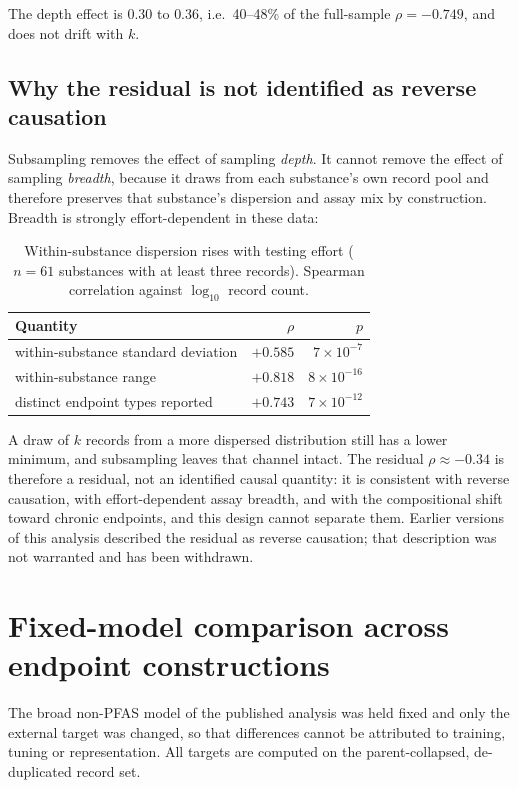 \documentclass[11pt]{article}
\begin{document}
The depth effect is $0.30$ to $0.36$, i.e.\ 40--48\% of the full-sample
$\rho=-0.749$, and does not drift with $k$.

\subsection*{Why the residual is not identified as reverse causation}

Subsampling removes the effect of sampling \emph{depth}. It cannot remove the
effect of sampling \emph{breadth}, because it draws from each substance's own
record pool and therefore preserves that substance's dispersion and assay mix
by construction. Breadth is strongly effort-dependent in these data:

\begin{table}[h]
\centering
\caption{Within-substance dispersion rises with testing effort ($n=61$
substances with at least three records). Spearman correlation against
$\log_{10}$ record count.}
\small
\begin{tabular}{lrr}
\toprule
Quantity & $\rho$ & $p$ \\
\midrule
within-substance standard deviation & $+0.585$ & $7\times10^{-7}$ \\
within-substance range              & $+0.818$ & $8\times10^{-16}$ \\
distinct endpoint types reported    & $+0.743$ & $7\times10^{-12}$ \\
\bottomrule
\end{tabular}
\end{table}

A draw of $k$ records from a more dispersed distribution still has a lower
minimum, and subsampling leaves that channel intact. The residual
$\rho\approx-0.34$ is therefore a residual, not an identified causal quantity:
it is consistent with reverse causation, with effort-dependent assay breadth,
and with the compositional shift toward chronic endpoints, and this design
cannot separate them. Earlier versions of this analysis described the residual
as reverse causation; that description was not warranted and has been withdrawn.

\section{Fixed-model comparison across endpoint constructions}

The broad non-PFAS model of the published analysis was held fixed and only the
external target was changed, so that differences cannot be attributed to
training, tuning or representation. All targets are computed on the
parent-collapsed, de-duplicated record set.
\end{document}
